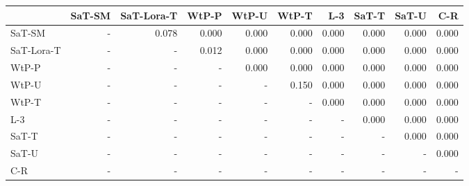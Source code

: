 \begin{tabular}{lrrrrrrrrr}
\toprule
 & SaT-SM & SaT-Lora-T & WtP-P & WtP-U & WtP-T & L-3 & SaT-T & SaT-U & C-R \\
\midrule
SaT-SM & - & 0.078 & 0.000 & 0.000 & 0.000 & 0.000 & 0.000 & 0.000 & 0.000 \\
SaT-Lora-T & - & - & 0.012 & 0.000 & 0.000 & 0.000 & 0.000 & 0.000 & 0.000 \\
WtP-P & - & - & - & 0.000 & 0.000 & 0.000 & 0.000 & 0.000 & 0.000 \\
WtP-U & - & - & - & - & 0.150 & 0.000 & 0.000 & 0.000 & 0.000 \\
WtP-T & - & - & - & - & - & 0.000 & 0.000 & 0.000 & 0.000 \\
L-3 & - & - & - & - & - & - & 0.000 & 0.000 & 0.000 \\
SaT-T & - & - & - & - & - & - & - & 0.000 & 0.000 \\
SaT-U & - & - & - & - & - & - & - & - & 0.000 \\
C-R & - & - & - & - & - & - & - & - & - \\
\bottomrule
\end{tabular}

